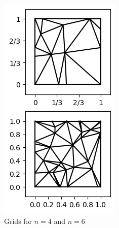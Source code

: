 \documentclass[11pt,a4paper]{article}
\begin{document}
\begin{figure}
  \centering
  \begin{subfigure}{.2\textwidth}
    \centering
    \includegraphics[width=1\linewidth]{unstructured_grids}
    \caption{Grids for $n=4$ and $n=6$}
  \end{subfigure}%
  \begin{subfigure}{.8\textwidth}

\end{subfigure}
\end{figure}
\end{document}
